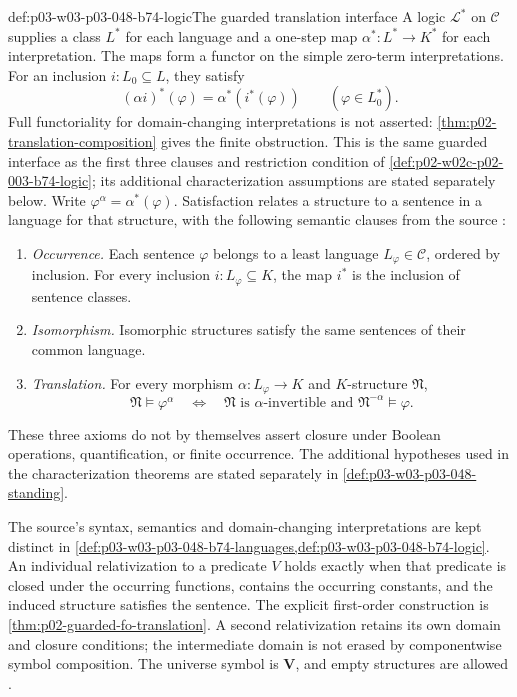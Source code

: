 \begin{hbdefinition}{def:p03-w03-p03-048-b74-logic}{The guarded translation interface}
A logic \(\mathcal L^\ast\) on \(\mathcal C\) supplies a class
\(L^\ast\) for each language and a one-step map
\(\alpha^\ast:L^\ast\to K^\ast\) for each interpretation.
The maps form a functor on the simple zero-term interpretations.
For an inclusion \(i:L_0\subseteq L\), they satisfy
\[
 (\alpha i)^\ast(\varphi)=\alpha^\ast(i^\ast(\varphi))
 \qquad(\varphi\in L_0^\ast).
\]
Full functoriality for domain-changing interpretations is not asserted:
\cref{thm:p02-translation-composition} gives the finite obstruction.
This is the same guarded interface as the first three clauses and
restriction condition of \cref{def:p02-w02c-p02-003-b74-logic}; its
additional characterization assumptions are stated separately below.
Write \(\varphi^\alpha=\alpha^\ast(\varphi)\). Satisfaction relates a
structure to a sentence in a language for that structure, with the
following semantic clauses from the source
\cite[Part~I, \S7, pp.~234--235]{Barwise1974Axioms}:
\begin{enumerate}
\item \emph{Occurrence.} Each sentence \(\varphi\) belongs to a least
      language \(L_\varphi\in\mathcal C\), ordered by inclusion.
      For every inclusion \(i:L_\varphi\subseteq K\), the map
      \(i^\ast\) is the inclusion of sentence classes.
\item \emph{Isomorphism.} Isomorphic structures satisfy the same
      sentences of their common language.
\item \emph{Translation.} For every morphism
      \(\alpha:L_\varphi\to K\) and \(K\)-structure
      \(\mathfrak N\),
      \[
       \mathfrak N\models\varphi^\alpha
       \quad\Longleftrightarrow\quad
       \mathfrak N\text{ is \(\alpha\)-invertible and }
       \mathfrak N^{-\alpha}\models\varphi.
      \]
\end{enumerate}
These three axioms do not by themselves assert closure under Boolean
operations, quantification, or finite occurrence. The additional
hypotheses used in the characterization theorems are stated separately
in \cref{def:p03-w03-p03-048-standing}.
\end{hbdefinition}

The source's syntax, semantics and domain-changing interpretations are
kept distinct in \cref{def:p03-w03-p03-048-b74-languages,def:p03-w03-p03-048-b74-logic}.
An individual relativization to a predicate \(V\) holds exactly when
that predicate is closed under the occurring functions, contains the
occurring constants, and the induced structure satisfies the sentence.
The explicit first-order construction is
\cref{thm:p02-guarded-fo-translation}. A second relativization retains its
own domain and closure conditions; the intermediate domain is not erased
by componentwise symbol composition. The universe symbol is
\(\mathbf V\), and empty structures are allowed
\cite[Part~I, \S3, p.~228]{Barwise1974Axioms}.

